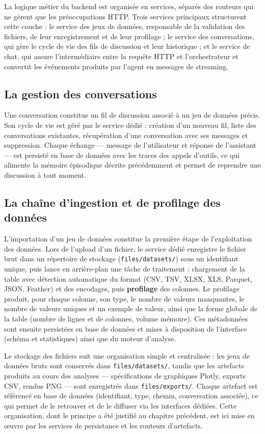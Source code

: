 La logique métier du backend est organisée en services, séparés des routeurs qui ne gèrent que les préoccupations HTTP. Trois services principaux structurent cette couche : le service des jeux de données, responsable de la validation des fichiers, de leur enregistrement et de leur profilage ; le service des conversations, qui gère le cycle de vie des fils de discussion et leur historique ; et le service de chat, qui assure l'intermédiaire entre la requête HTTP et l'orchestrateur et convertit les événements produits par l'agent en messages de streaming.

\subsection{La gestion des conversations}

Une conversation constitue un fil de discussion associé à un jeu de données précis. Son cycle de vie est géré par le service dédié : création d'un nouveau fil, liste des conversations existantes, récupération d'une conversation avec ses messages et suppression. Chaque échange — message de l'utilisateur et réponse de l'assistant — est persisté en base de données avec les traces des appels d'outils, ce qui alimente la mémoire épisodique décrite précédemment et permet de reprendre une discussion à tout moment.

\subsection{La chaîne d'ingestion et de profilage des données}

L'importation d'un jeu de données constitue la première étape de l'exploitation des données. Lors de l'upload d'un fichier, le service dédié enregistre le fichier brut dans un répertoire de stockage (\texttt{files/datasets/}) sous un identifiant unique, puis lance en arrière-plan une tâche de traitement : chargement de la table avec détection automatique du format (CSV, TSV, XLSX, XLS, Parquet, JSON, Feather) et des encodages, puis \textbf{profilage} des colonnes. Le profilage produit, pour chaque colonne, son type, le nombre de valeurs manquantes, le nombre de valeurs uniques et un exemple de valeur, ainsi que la forme globale de la table (nombre de lignes et de colonnes, volume mémoire). Ces métadonnées sont ensuite persistées en base de données et mises à disposition de l'interface (schéma et statistiques) ainsi que du moteur d'analyse.

Le stockage des fichiers suit une organisation simple et centralisée : les jeux de données bruts sont conservés dans \texttt{files/datasets/}, tandis que les artefacts produits au cours des analyses — spécifications de graphiques Plotly, exports CSV, rendus PNG — sont enregistrés dans \texttt{files/exports/}. Chaque artefact est référencé en base de données (identifiant, type, chemin, conversation associée), ce qui permet de le retrouver et de le diffuser via les interfaces dédiées. Cette organisation, dont le principe a été justifié au chapitre précédent, est ici mise en œuvre par les services de persistance et les routeurs d'artefacts.

